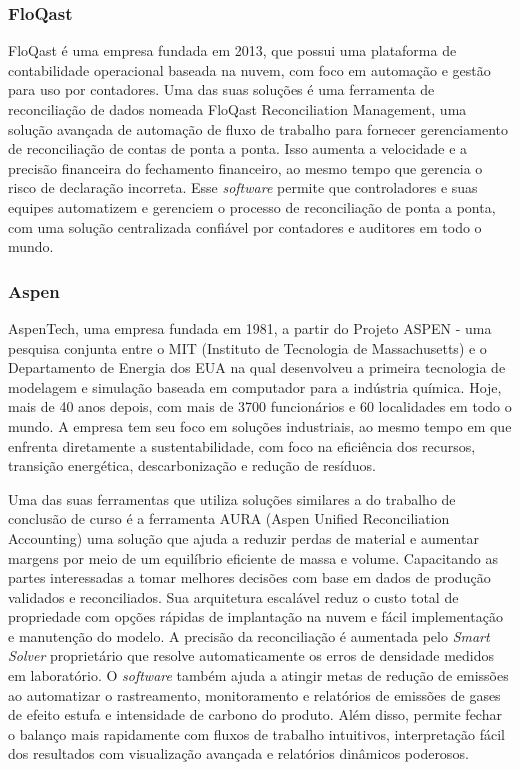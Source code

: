 \subsubsection{FloQast}

FloQast é uma empresa fundada em 2013, que possui uma plataforma  de contabilidade operacional baseada na nuvem, com foco em automação e gestão para uso por contadores. Uma das suas soluções é uma ferramenta de reconciliação de dados nomeada FloQast Reconciliation Management, uma solução avançada de automação de fluxo de trabalho para fornecer gerenciamento de reconciliação de contas de ponta a ponta. Isso aumenta a velocidade e a precisão financeira do fechamento financeiro, ao mesmo tempo que gerencia o risco de declaração incorreta. Esse \textit{software} permite que controladores e suas equipes automatizem e gerenciem o processo de reconciliação de ponta a ponta, com uma solução centralizada confiável por contadores e auditores em todo o mundo.

\subsubsection{Aspen}

AspenTech, uma empresa fundada em 1981, a partir do Projeto ASPEN - uma pesquisa conjunta entre o MIT (Instituto de Tecnologia de Massachusetts) e o Departamento de Energia dos EUA na qual desenvolveu a primeira tecnologia de modelagem e simulação baseada em computador para a indústria química. Hoje, mais de 40 anos depois, com mais de 3700 funcionários e 60 localidades em todo o mundo. A empresa tem seu foco em soluções industriais, ao mesmo tempo em que enfrenta diretamente a sustentabilidade, com foco na eficiência dos recursos, transição energética, descarbonização e redução de resíduos.

Uma das suas ferramentas que utiliza soluções similares a do trabalho de conclusão de curso é a ferramenta AURA (Aspen Unified Reconciliation Accounting) uma solução que ajuda a reduzir perdas de material e aumentar margens por meio de um equilíbrio eficiente de massa e volume. Capacitando as partes interessadas a tomar melhores decisões com base em dados de produção validados e reconciliados. Sua arquitetura escalável reduz o custo total de propriedade com opções rápidas de implantação na nuvem e fácil implementação e manutenção do modelo. A precisão da reconciliação é aumentada pelo \textit{Smart Solver} proprietário que resolve automaticamente os erros de densidade medidos em laboratório. O \textit{software} também ajuda a atingir metas de redução de emissões ao automatizar o rastreamento, monitoramento e relatórios de emissões de gases de efeito estufa e intensidade de carbono do produto. Além disso, permite fechar o balanço mais rapidamente com fluxos de trabalho intuitivos, interpretação fácil dos resultados com visualização avançada e relatórios dinâmicos poderosos.


